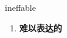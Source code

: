 
\begin{frame}
{\huge ineffable}
\begin{center}
\begin{enumerate}\Large
  \item \textbf{难以表达的}
\end{enumerate}
\end{center}
\end{frame}
